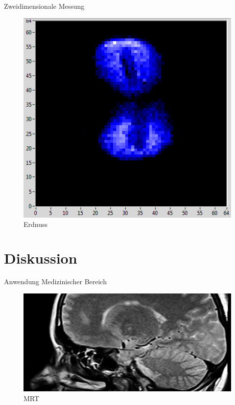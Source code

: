 \begin{frame}{Zweidimensionale Messung}
	\begin{figure}
	\centering
	\includegraphics[scale=.5]{..//figures//peanut.png}
	\caption{Erdnuss}
	\end{figure}
\end{frame}




\section{Diskussion}
\begin{frame}{Anwendung}
Medizinischer Bereich
	\begin{figure}
	\centering
	\includegraphics[scale=.35]{images//mrt.jpg}
	\caption{MRT}
	\end{figure}
\end{frame}

